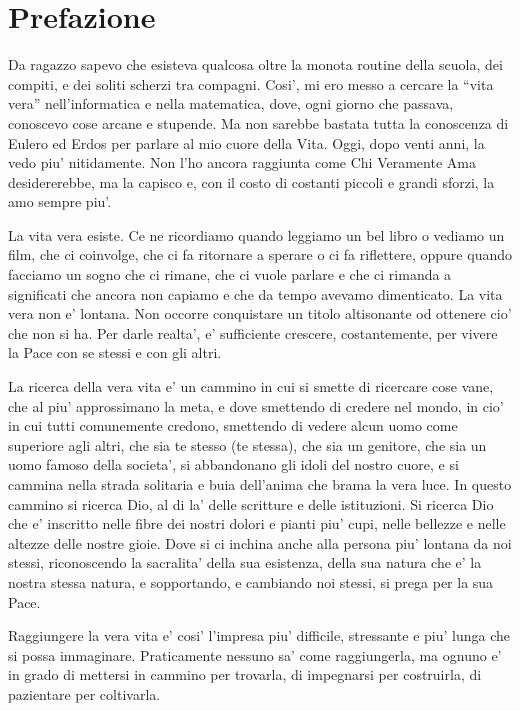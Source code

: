 \chapter{Prefazione}
Da ragazzo sapevo che esisteva qualcosa oltre la monota routine della scuola, dei compiti, e dei soliti scherzi tra compagni. Cosi', mi ero messo a cercare la ``vita vera'' nell'informatica e nella matematica, dove, ogni giorno che passava, conoscevo cose arcane e stupende. Ma non sarebbe bastata tutta la conoscenza di Eulero ed Erdos per parlare al mio cuore della Vita. Oggi, dopo venti anni, la vedo piu' nitidamente. Non l'ho ancora raggiunta come Chi Veramente Ama desidererebbe, ma la capisco e, con il costo di costanti piccoli e grandi sforzi, la amo sempre piu'.

La vita vera esiste. Ce ne ricordiamo quando leggiamo un bel libro o vediamo un film, che ci coinvolge, che ci fa ritornare a sperare o ci fa riflettere, oppure quando facciamo un sogno che ci rimane, che ci vuole parlare e che ci rimanda a significati che ancora non capiamo e che da tempo avevamo dimenticato. La vita vera non e' lontana. Non occorre conquistare un titolo altisonante od ottenere cio' che non si ha. Per darle realta', e' sufficiente crescere, costantemente, per vivere la Pace con se stessi e con gli altri. 

La ricerca della vera vita e' un cammino in cui si smette di ricercare cose vane, che al piu' approssimano la meta, e dove smettendo di credere nel mondo, in cio' in cui tutti comunemente credono, smettendo di vedere alcun uomo come superiore agli altri, che sia te stesso (te stessa), che sia un genitore, che sia un uomo famoso della societa', si abbandonano gli idoli del nostro cuore, e si cammina nella strada solitaria e buia dell'anima che brama la vera luce. In questo cammino si ricerca Dio, al di la' delle scritture e delle istituzioni. Si ricerca Dio che e' inscritto nelle fibre dei nostri dolori e pianti piu' cupi, nelle bellezze e nelle altezze delle nostre gioie. Dove si ci inchina anche alla persona piu' lontana da noi stessi, riconoscendo la sacralita' della sua esistenza, della sua natura che e' la nostra stessa natura, e sopportando, e cambiando noi stessi, si prega per la sua Pace.

Raggiungere la vera vita e' cosi' l'impresa piu' difficile, stressante e piu' lunga che si possa immaginare. Praticamente nessuno sa' come raggiungerla, ma ognuno e' in grado di mettersi in cammino per trovarla, di impegnarsi per costruirla, di pazientare per coltivarla.

